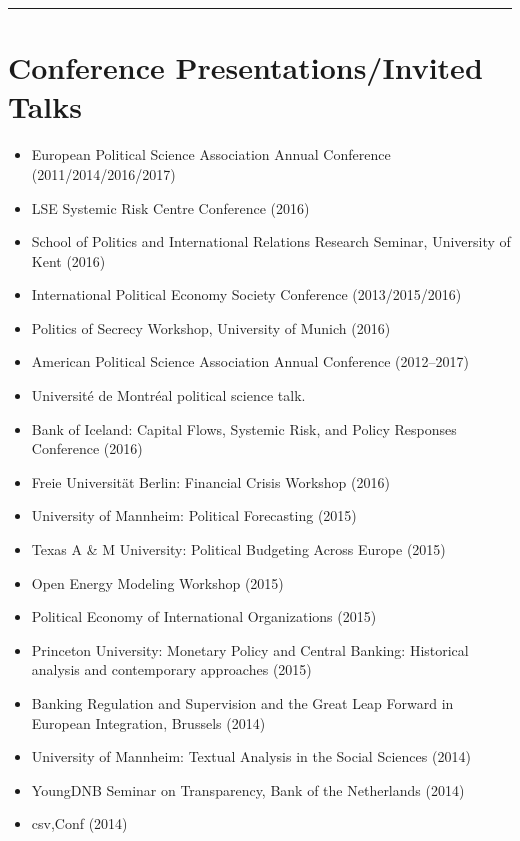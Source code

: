 \documentclass[a4paper]{article}
\begin{document}
\vspace{0.25cm}
\medskip\hrule height 1pt
\vspace{0.5cm}

\section*{Conference Presentations/Invited Talks}

\begin{itemize}
    \item European Political Science Association Annual Conference (2011/2014/2016/2017)
    \item LSE Systemic Risk Centre Conference (2016)
    \item School of Politics and International Relations Research Seminar, University of Kent (2016)
    \item International Political Economy Society Conference (2013/2015/2016)
    \item Politics of Secrecy Workshop, University of Munich (2016)
    \item American Political Science Association Annual Conference (2012--2017)
    \item Universit\'{e} de Montr\'{e}al political science talk.
    \item Bank of Iceland: Capital Flows, Systemic Risk, and Policy Responses Conference (2016)
    \item Freie Universit\"{a}t Berlin: Financial Crisis Workshop (2016)
    \item University of Mannheim: Political Forecasting (2015)
    \item Texas A \& M University: Political Budgeting Across Europe (2015)
    \item Open Energy Modeling Workshop (2015)
    \item Political Economy of International Organizations (2015)
    \item Princeton University: Monetary Policy and Central Banking: Historical analysis and contemporary approaches (2015)
    \item Banking Regulation and Supervision and the Great Leap Forward in European Integration, Brussels (2014)
    \item University of Mannheim: Textual Analysis in the Social Sciences (2014)
    \item YoungDNB Seminar on Transparency, Bank of the Netherlands (2014)
    \item csv,Conf (2014)

\end{itemize}
\end{document}
